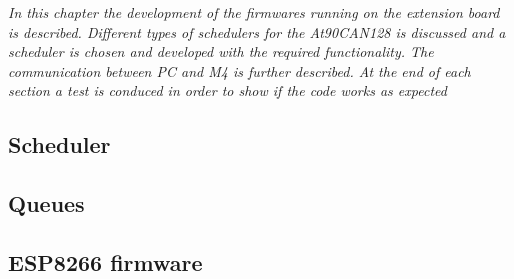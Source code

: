 \textit{In this chapter the development of the firmwares running on the extension board is described. Different types of schedulers for the At90CAN128 is discussed and a scheduler is chosen and developed with the required functionality. The communication between PC and M4 is further described. At the end of each section a test is conduced in order to show if the code works as expected }
\subsection{Scheduler}

\newpage

\subsection{Queues}

\newpage
%

\subsection{ESP8266 firmware} \label{sec:exp8266_firmware}


\newpage

